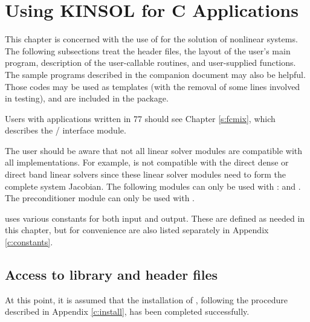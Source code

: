 \chapter{Using KINSOL for C Applications}\label{c:usage}

This chapter is concerned with the use of {\kinsol} for the solution
of nonlinear systems. The following subsections treat the header
files, the layout of the user's main program, description of the
{\kinsol} user-callable routines, and user-supplied functions.
The sample programs described in the companion document
\cite{kinsol_ex} may also be helpful.  Those codes may be used as
templates (with the removal of some lines involved in testing), and
are included in the {\kinsol} package.

Users with applications written in {\F}77 should see Chapter \ref{s:fcmix},
which describes the {\F}/{\C} interface module.

The user should be aware that not all linear solver modules are compatible 
with all {\nvector} implementations. 
For example, {\nvecp} is not compatible with the direct dense or direct band 
linear solvers since these linear solver modules need to form the complete
system Jacobian. The following {\kinsol} modules can only be used with {\nvecs}:
{\kindense} and {\kinband}. The preconditioner module {\kinbbdpre}
can only be used with {\nvecp}.

{\kinsol} uses various constants for both input and output. These are
defined as needed in this chapter, but for convenience are also listed
separately in Appendix \ref{c:constants}.

\section{Access to library and header files}\label{ss:file_access}

At this point, it is assumed that the installation of {\kinsol},
following the procedure described in Appendix \ref{c:install}, has
been completed successfully.

